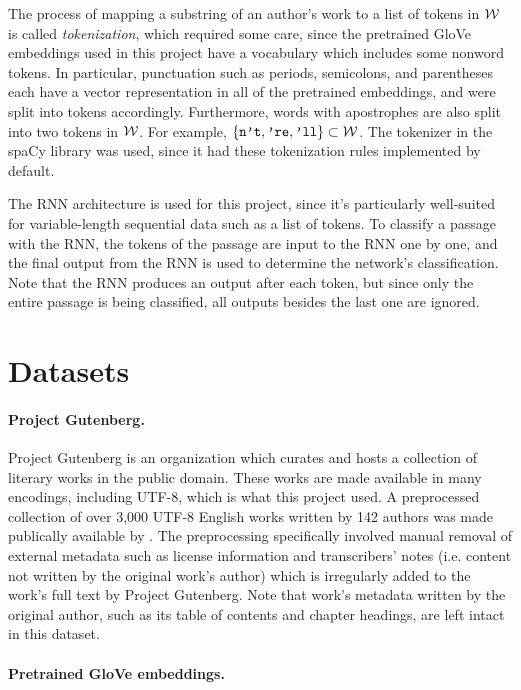 \documentclass[12pt,letterpaper]{article}
\begin{document}
The process of mapping a substring of an author's work to a list of tokens in $\mathcal{W}$ is called \emph{tokenization}, which required some care, since the pretrained GloVe embeddings used in this project have a vocabulary which includes some nonword tokens. In particular, punctuation such as periods, semicolons, and parentheses each have a vector representation in all of the pretrained embeddings, and were split into tokens accordingly. Furthermore, words with apostrophes are also split into two tokens in $\mathcal{W}$. For example, $\{\texttt{n't}, \texttt{'re}, \texttt{'ll}\} \subset \mathcal{W}$. The tokenizer in the spaCy library \cite{spacy} was used, since it had these tokenization rules implemented by default.

The RNN architecture is used for this project, since it's particularly well-suited for variable-length sequential data such as a list of tokens. To classify a passage with the RNN, the tokens of the passage are input to the RNN one by one, and the final output from the RNN is used to determine the network's classification. Note that the RNN produces an output after each token, but since only the entire passage is being classified, all outputs besides the last one are ignored.

\section{Datasets}
\label{sec:datasets}

\paragraph{Project Gutenberg.} 

Project Gutenberg \cite{gutenberg} is an organization which curates and hosts a collection of literary works in the public domain. These works are made available in many encodings, including UTF-8, which is what this project used. A preprocessed collection of over 3,000 UTF-8 English works written by 142 authors was made publically available by \cite{lahiri:2014:SRW}. The preprocessing specifically involved manual removal of external metadata such as license information and transcribers' notes (i.e. content not written by the original work's author) which is irregularly added to the work's full text by Project Gutenberg. Note that work's metadata written by the original author, such as its table of contents and chapter headings, are left intact in this dataset.

\paragraph{Pretrained GloVe embeddings.}
\end{document}
